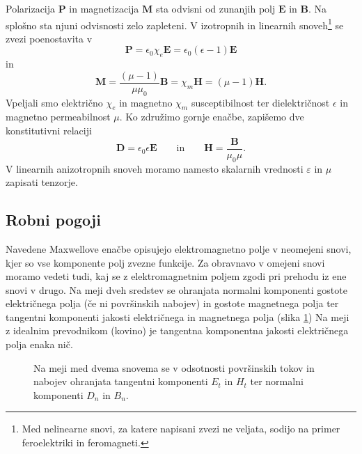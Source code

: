 Polarizacija $\mathbf{P}$ in magnetizacija $\mathbf{M}$ sta odvisni od zunanjih polj $\mathbf{E}$
in $\mathbf{B}$. Na splošno sta njuni odvisnosti zelo zapleteni.
V izotropnih in linearnih snoveh\footnote{Med nelinearne snovi, za katere
napisani zvezi ne veljata, sodijo na primer feroelektriki in feromagneti.}
 se zvezi poenostavita v 
\begin{equation}
\mathbf{P}=\epsilon_{0}\chi_e\mathbf{E} = \epsilon_{0}(\epsilon-1)\mathbf{E} 
\label{eq:PM}
\end{equation}
in
\begin{equation}
\mathbf{M}=\frac{(\mu-1)}{\mu\mu_0}\mathbf{B} = \chi_m \mathbf{H} = (\mu-1)\mathbf{H}.
\end{equation}
Vpeljali smo  električno $\chi_e$ in 
magnetno $\chi_m$ susceptibilnost ter
dielektričnost $\epsilon$ in
magnetno permeabilnost $\mu$. Ko združimo gornje
enačbe, zapišemo dve konstitutivni
relaciji
\begin{equation}
\mathbf{D}  =\epsilon_{0}\epsilon\mathbf{E}\qquad \textrm{in} 
\qquad
\mathbf{H}  =\frac{\mathbf{B}}{\mu_{0}\mu}.
\end{equation}
V linearnih anizotropnih snoveh moramo namesto skalarnih vrednosti $\varepsilon$
in $\mu$ zapisati tenzorje. 

\subsection*{Robni pogoji}
Navedene Maxwellove enačbe opisujejo elektromagnetno polje
v neomejeni snovi, kjer so vse komponente polj zvezne funkcije. Za
obravnavo v omejeni snovi moramo vedeti tudi, kaj se z elektromagnetnim
poljem zgodi pri prehodu iz ene snovi v drugo.
Na meji dveh sredstev se ohranjata normalni komponenti gostote
električnega polja (če ni površinskih nabojev) in gostote magnetnega polja 
ter tangentni komponenti jakosti
električnega in magnetnega polja (slika \ref{fig:Robni-pogoji})
Na meji z idealnim prevodnikom (kovino) je tangentna komponentna 
jakosti električnega polja enaka nič.

\begin{figure}[h]
\centering
  \def\svgwidth{85truemm} 
  
\caption{Na meji med dvema snovema se v odsotnosti površinskih tokov
in nabojev ohranjata tangentni komponenti $E_t$ in $H_t$ ter 
normalni komponenti $D_n$ in $B_n$.}
\label{fig:Robni-pogoji}
\end{figure}

